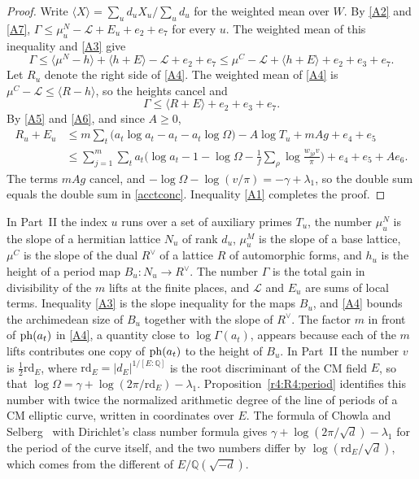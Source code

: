 \begin{proof}
Write $\langle X\rangle=\sum_ud_uX_u/\sum_ud_u$ for the weighted mean over $W$. By \eqref{A2} and \eqref{A7}, $\Gamma\le\mu^N_u-\mathcal L+E_u+e_2+e_7$ for every $u$. The weighted mean of this inequality and \eqref{A3} give
\[
\Gamma\le\langle\mu^N-h\rangle+\langle h+E\rangle-\mathcal L+e_2+e_7\le\mu^C-\mathcal L+\langle h+E\rangle+e_2+e_3+e_7 .
\]
Let $R_u$ denote the right side of \eqref{A4}. The weighted mean of \eqref{A4} is $\mu^C-\mathcal L\le\langle R-h\rangle$, so the heights cancel and
\[
\Gamma\le\langle R+E\rangle+e_2+e_3+e_7 .
\]
By \eqref{A5} and \eqref{A6}, and since $A\ge0$,
\begin{align*}
R_u+E_u&\le m\sum_t\big(a_t\log a_t-a_t-a_t\log\Omega\big)-A\log T_u+mAg+e_4+e_5\\
&\le\sum_{j=1}^m\sum_ta_t\Big(\log a_t-1-\log\Omega-\frac1f\sum_\rho\log\frac{w_{j\rho}v}{\pi}\Big)+e_4+e_5+Ae_6 .
\end{align*}
The terms $mAg$ cancel, and $-\log\Omega-\log(v/\pi)=-\gamma+\lambda_1$, so the double sum equals the double sum in \eqref{acctconc}. Inequality \eqref{A1} completes the proof.
\end{proof}

In Part~II the index $u$ runs over a set of auxiliary primes $T_u$, the number $\mu^N_u$ is the slope of a hermitian lattice $N_u$ of rank $d_u$, $\mu^M_u$ is the slope of a base lattice, $\mu^C$ is the slope of the dual $R^\vee$ of a lattice $R$ of automorphic forms, and $h_u$ is the height of a period map $B_u\colon N_u\to R^\vee$. The number $\Gamma$ is the total gain in divisibility of the $m$ lifts at the finite places, and $\mathcal L$ and $E_u$ are sums of local terms. Inequality \eqref{A3} is the slope inequality for the maps $B_u$, and \eqref{A4} bounds the archimedean size of $B_u$ together with the slope of $R^\vee$. The factor $m$ in front of $\operatorname{ph}(a_t)$ in \eqref{A4}, a quantity close to $\log\Gamma(a_t)$, appears because each of the $m$ lifts contributes one copy of $\operatorname{ph}(a_t)$ to the height of $B_u$. In Part~II the number $v$ is $\frac12\mathrm{rd}_E$, where $\mathrm{rd}_E=\lvert d_E\rvert^{1/[E:\mathbb Q]}$ is the root discriminant of the CM field $E$, so that $\log\Omega=\gamma+\log(2\pi/\mathrm{rd}_E)-\lambda_1$. Proposition~\ref{r4:R4:period} identifies this number with twice the normalized arithmetic degree of the line of periods of a CM elliptic curve, written in coordinates over $E$. The formula of Chowla and Selberg~\cite{chowlaselberg} with Dirichlet's class number formula gives $\gamma+\log(2\pi/\sqrt d)-\lambda_1$ for the period of the curve itself, and the two numbers differ by $\log(\mathrm{rd}_E/\sqrt d)$, which comes from the different of $E/\mathbb Q(\sqrt{-d})$.

